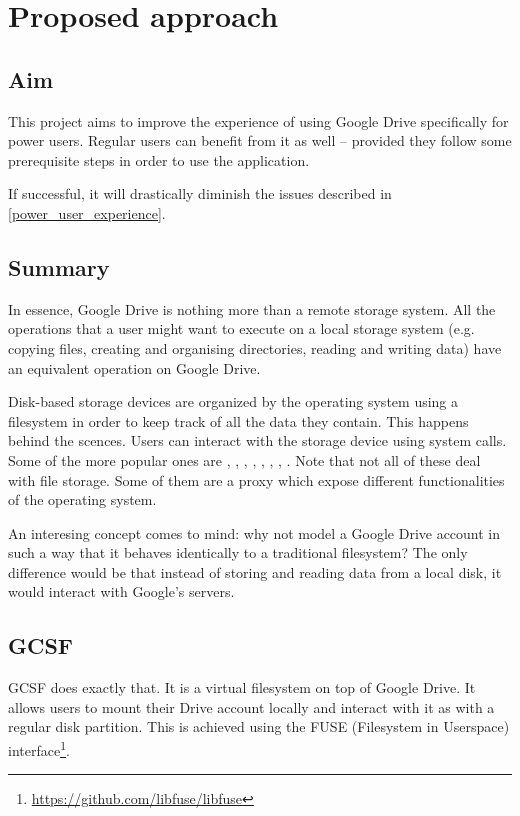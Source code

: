 \chapter{Proposed approach}

\section{Aim}

This project aims to improve the experience of using Google Drive specifically for power users. Regular users can benefit from it as well -- provided they follow some prerequisite steps in order to use the application.

If successful, it will drastically diminish the issues described in \ref{power_user_experience}.

\section{Summary}

In essence, Google Drive is nothing more than a remote storage system. All the operations that a user might want to execute on a local storage system (e.g. copying files, creating and organising directories, reading and writing data) have an equivalent operation on Google Drive.

Disk-based storage devices are organized by the operating system using a filesystem in order to keep track of all the data they contain. This happens behind the scences. Users can interact with the storage device using system calls. Some of the more popular ones are , , , , , , , . Note that not all of these deal with file storage. Some of them are a proxy which expose different functionalities of the operating system.

An interesing concept comes to mind: why not model a Google Drive account in such a way that it behaves identically to a traditional filesystem? The only difference would be that instead of storing and reading data from a local disk, it would interact with Google's servers.

\section{GCSF}

GCSF does exactly that. It is a virtual filesystem on top of Google Drive. It allows users to mount their Drive account locally and interact with it as with a regular disk partition. This is achieved using the FUSE (Filesystem in Userspace) interface\footnote{\url{https://github.com/libfuse/libfuse}}.

